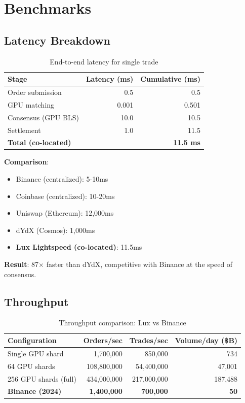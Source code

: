 \section{Benchmarks}


\subsection{Latency Breakdown}

\begin{table}[h]
\centering
\begin{tabular}{lrr}
\toprule
\textbf{Stage} & \textbf{Latency (ms)} & \textbf{Cumulative (ms)} \\
\midrule
Order submission & 0.5 & 0.5 \\
GPU matching & 0.001 & 0.501 \\
Consensus (GPU BLS) & 10.0 & 10.5 \\
Settlement & 1.0 & 11.5 \\
\midrule
\textbf{Total (co-located)} & & \textbf{11.5 ms} \\
\bottomrule
\end{tabular}
\caption{End-to-end latency for single trade}
\end{table}

\textbf{Comparison}:
\begin{itemize}
    \item Binance (centralized): 5-10ms
    \item Coinbase (centralized): 10-20ms
    \item Uniswap (Ethereum): 12,000ms
    \item dYdX (Cosmos): 1,000ms
    \item \textbf{Lux Lightspeed (co-located)}: 11.5ms
\end{itemize}

\textbf{Result}: 87$\times$ faster than dYdX, competitive with Binance at the speed of consensus.

\subsection{Throughput}

\begin{table}[h]
\centering
\begin{tabular}{lrrr}
\toprule
\textbf{Configuration} & \textbf{Orders/sec} & \textbf{Trades/sec} & \textbf{Volume/day (\$B)} \\
\midrule
Single GPU shard & 1,700,000 & 850,000 & 734 \\
64 GPU shards & 108,800,000 & 54,400,000 & 47,001 \\
256 GPU shards (full) & 434,000,000 & 217,000,000 & 187,488 \\
\midrule
\textbf{Binance (2024)} & \textbf{1,400,000} & \textbf{700,000} & \textbf{50} \\
\bottomrule
\end{tabular}
\caption{Throughput comparison: Lux vs Binance}
\end{table}

